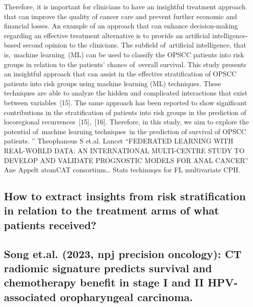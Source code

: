 \documentclass{article}%
\begin{document}
\newline%
\newline%
%
Therefore, it is important for clinicians to have an insightful treatment approach that can improve the quality of cancer care and prevent further economic and financial losses. An example of an approach that can enhance decision{-}making regarding an effective treatment alternative is to provide an artificial intelligence{-}based second opinion to the clinicians. The subfield of~artificial intelligence, that is,~machine learning~(ML) can be used to classify the OPSCC patients into risk groups in relation to the patients’ chance of~overall survival.%
\newline%
\newline%
%
This study presents an insightful approach that can assist in the effective stratification of OPSCC patients into risk groups using machine learning (ML) techniques. These techniques are able to analyze the hidden and complicated interactions that exist between variables~{[}15{]}. The same approach has been reported to show significant contributions in the stratification of patients into risk groups in the prediction of locoregional recurrences~{[}15{]},~{[}16{]}. Therefore, in this study, we aim to explore the potential of~machine learning techniques~in the prediction of survival of OPSCC patients.%
\newline%
\newline%
%
”%
\newline%
\newline%
%
Theophanous S et.al. Lancet “FEDERATED LEARNING WITH REAL{-}WORLD DATA: AN INTERNATIONAL MULTI{-}CENTRE STUDY TO DEVELOP AND VALIDATE PROGNOSTIC MODELS FOR ANAL CANCER” Ane Appelt atomCAT consortium… %
\newline%
\newline%
%
Stats techinuqes for FL multivariate CPH. %
\newline%
\newline%
%
%
\newline%
\newline%
%
\subsection{How to extract insights from risk stratification in relation to the treatment arms of what patients received? }%
\label{subsec:Howtoextractinsightsfromriskstratificationinrelationtothetreatmentarmsofwhatpatientsreceived?}%

%
\subsection{Song et.al. (2023, npj precision oncology): CT radiomic signature predicts survival and chemotherapy benefit in stage I and II HPV{-}associated oropharyngeal carcinoma. }%
\label{subsec:Songet.al.(2023,npjprecisiononcology)CTradiomicsignaturepredictssurvivalandchemotherapybenefitinstageIandIIHPV{-}associatedoropharyngealcarcinoma.}%
\end{document}
